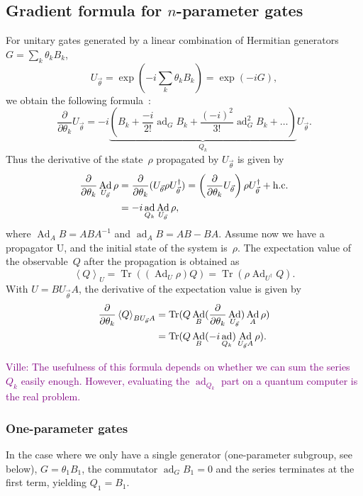 \documentclass[aps,pra,10pt,twocolumn,groupedaddress,nofootinbib]{revtex4-1}
\theoremstyle{plain}
\DeclareMathOperator{\tr}{Tr}
\DeclareMathOperator{\Ad}{Ad}
\DeclareMathOperator{\ad}{ad}
\newcommand{\pd}[2]{\frac{\partial #1}{\partial #2}}  %
\newcommand{\be}{\begin{equation}}
\newcommand{\ee}{\end{equation}}
\newcommand{\expect}[1]{\ensuremath{\left\langle #1 \right\rangle}} %
\newcommand{\ville}[1]{\textcolor{purple}{Ville: #1}}
\begin{document}
\subsection{Gradient formula for $n$-parameter gates}
\label{sec:gradient_formula_for_n_parameter_gates}
For unitary gates generated by a linear combination of Hermitian generators
$G = \sum_k \theta_k B_k$,
\be
U_{\vec{\theta}} = \exp(-i \sum_k \theta_k B_k) = \exp(-i G),
\ee
we obtain the following formula~\cite{dynamo_manual}:
\be
\pd{}{\theta_k} U_{\vec{\theta}}
= -i \underbrace{\left(B_k +\frac{-i}{2!}\ad_G B_k +\frac{(-i)^2}{3!}\ad_G^2 B_k +\ldots \right)}_{Q_k}
U_{\vec{\theta}}.
\ee
Thus the derivative of the state~$\rho$ propagated by $U_{\vec{\theta}}$ is given by
\begin{align}
  \notag
  \pd{}{\theta_k} \Ad_{U_{\vec{\theta}}} \rho
  &= \pd{}{\theta_k} (U_{\vec{\theta}} \rho U_{\vec{\theta}}^\dagger)
  = \left(\pd{}{\theta_k} U_{\vec{\theta}}\right) \rho U_{\vec{\theta}}^\dagger +\text{h.c.}\\
  &= -i \ad_{Q_k} \Ad_{U_{\vec{\theta}}} \rho,
\end{align}
where $\Ad_{A} B = A B A^{-1}$ and $\ad_{A} B = A B - B A$.
Assume now we have a propagator U, and the initial state of the system is~$\rho$.
The expectation value of the observable~$Q$ after the propagation is obtained as
\be
\expect{Q}_U = \tr((\Ad_{U}\rho) Q)
= \tr(\rho \Ad_{U^\dagger}Q).
\ee
With $U=B U_{\vec{\theta}} A$, the derivative of the expectation value is given by
\begin{align}
  \label{eq:d_ev}
  \notag
  \pd{}{\theta_k} \expect{Q}_{B U_{\vec{\theta}} A}
  &= \tr(Q \Ad_B (\pd{}{\theta_k} \Ad_{U_{\vec{\theta}}}) \Ad_A \rho)\\
  &= \tr(Q \Ad_B (-i \ad_{Q_k}) \Ad_{U_{\vec{\theta}} A} \rho).
\end{align}

\ville{The usefulness of this formula depends on whether we can sum the series~$Q_k$ easily enough.
  However, evaluating the $\ad_{Q_k}$ part on a quantum computer is the real problem.
}

\subsubsection{One-parameter gates}

In the case where we only have a single generator (one-parameter subgroup, see below),
$G = \theta_1 B_1$, the commutator $\ad_G B_1 = 0$
and the series terminates at the first term, yielding
$Q_1 = B_1$.
\end{document}
